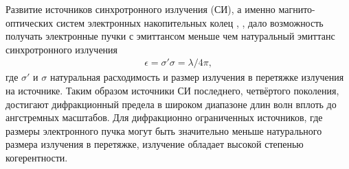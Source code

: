 
%
Развитие источников синхротронного излучения (СИ), а именно магнито-оптических систем электронных накопительных колец \cite{bartolini_challenges_2021}, \cite{hettel_challenges_2014}, дало возможность получать электронные пучки с эмиттансом меньше чем натуральный эмиттанс синхротронного излучения 
\begin{align}
	\epsilon = \sigma'\sigma = \lambda/4\pi,
\end{align}
где $\sigma'$ и $\sigma$ натуральная расходимость и размер излучения в перетяжке излучения на источнике. Таким образом источники СИ последнего, четвёртого поколения, достигают дифракционный предела в широком диапазоне длин волн вплоть до ангстремных масштабов. Для дифракционно ограниченных источников, где размеры электронного пучка могут быть значительно меньше натурального размера излучения в перетяжке, излучение обладает высокой степенью когерентности. 

